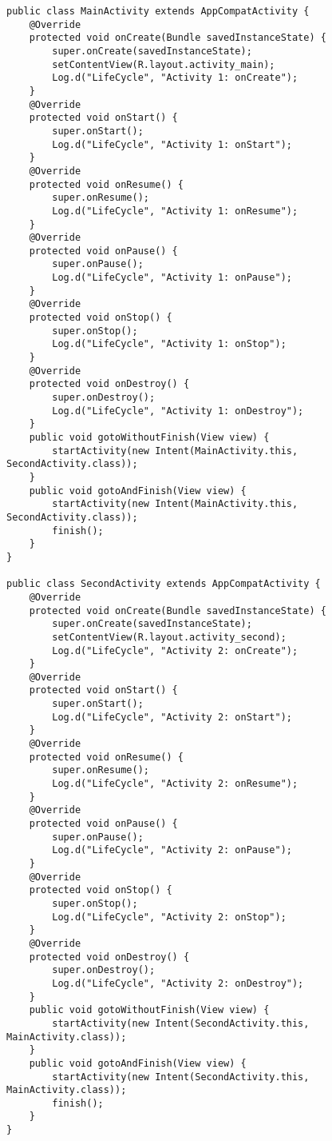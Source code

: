 \begin{lstlisting}[style=A_Java,caption={Overriding on activity lifecycle callbacks for two activities},label={listing:twoactjava}]
public class MainActivity extends AppCompatActivity {
    @Override
    protected void onCreate(Bundle savedInstanceState) {
        super.onCreate(savedInstanceState);
        setContentView(R.layout.activity_main);
        Log.d("LifeCycle", "Activity 1: onCreate");
    }
    @Override
    protected void onStart() {
        super.onStart();
        Log.d("LifeCycle", "Activity 1: onStart");
    }
    @Override
    protected void onResume() {
        super.onResume();
        Log.d("LifeCycle", "Activity 1: onResume");
    }
    @Override
    protected void onPause() {
        super.onPause();
        Log.d("LifeCycle", "Activity 1: onPause");
    }
    @Override
    protected void onStop() {
        super.onStop();
        Log.d("LifeCycle", "Activity 1: onStop");
    }
    @Override
    protected void onDestroy() {
        super.onDestroy();
        Log.d("LifeCycle", "Activity 1: onDestroy");
    }
    public void gotoWithoutFinish(View view) {
        startActivity(new Intent(MainActivity.this, SecondActivity.class));
    }
    public void gotoAndFinish(View view) {
        startActivity(new Intent(MainActivity.this, SecondActivity.class));
        finish();
    }
}

public class SecondActivity extends AppCompatActivity {
    @Override
    protected void onCreate(Bundle savedInstanceState) {
        super.onCreate(savedInstanceState);
        setContentView(R.layout.activity_second);
        Log.d("LifeCycle", "Activity 2: onCreate");
    }
    @Override
    protected void onStart() {
        super.onStart();
        Log.d("LifeCycle", "Activity 2: onStart");
    }
    @Override
    protected void onResume() {
        super.onResume();
        Log.d("LifeCycle", "Activity 2: onResume");
    }
    @Override
    protected void onPause() {
        super.onPause();
        Log.d("LifeCycle", "Activity 2: onPause");
    }
    @Override
    protected void onStop() {
        super.onStop();
        Log.d("LifeCycle", "Activity 2: onStop");
    }
    @Override
    protected void onDestroy() {
        super.onDestroy();
        Log.d("LifeCycle", "Activity 2: onDestroy");
    }
    public void gotoWithoutFinish(View view) {
        startActivity(new Intent(SecondActivity.this, MainActivity.class));
    }
    public void gotoAndFinish(View view) {
        startActivity(new Intent(SecondActivity.this, MainActivity.class));
        finish();
    }
}
\end{lstlisting}


